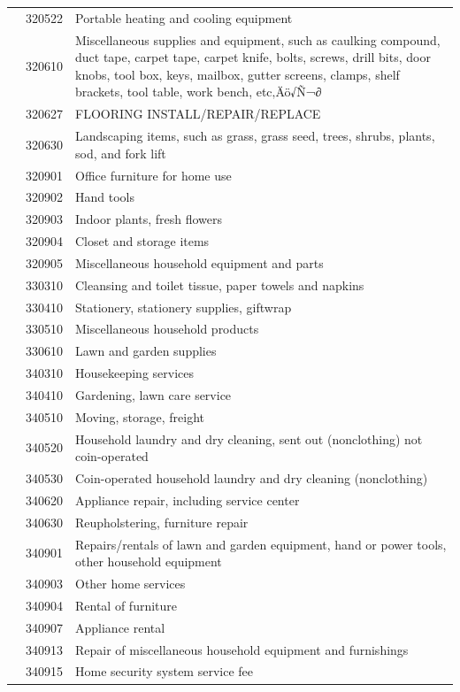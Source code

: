 \documentclass[
]{agujournal2019}
\begin{document}
\begin{table}
{\begin{tabular*}{\linewidth}{@{\extracolsep{\fill}}l|rl}
 & 320522 & Portable heating and cooling equipment \\ 
 & 320610 & Miscellaneous supplies and equipment, such as caulking compound, duct tape, carpet tape, carpet knife, bolts, screws, drill bits, door knobs, tool box, keys, mailbox, gutter screens, clamps, shelf brackets, tool table, work bench, etc‚Äö√Ñ¬∂ \\ 
 & 320627 & FLOORING INSTALL/REPAIR/REPLACE \\ 
 & 320630 & Landscaping items, such as grass, grass seed, trees, shrubs, plants, sod, and fork lift \\ 
 & 320901 & Office furniture for home use \\ 
 & 320902 & Hand tools \\ 
 & 320903 & Indoor plants, fresh flowers \\ 
 & 320904 & Closet and storage items \\ 
 & 320905 & Miscellaneous household equipment and parts \\ 
 & 330310 & Cleansing and toilet tissue, paper towels and napkins \\ 
 & 330410 & Stationery, stationery supplies, giftwrap \\ 
 & 330510 & Miscellaneous household products \\ 
 & 330610 & Lawn and garden supplies \\ 
 & 340310 & Housekeeping services \\ 
 & 340410 & Gardening, lawn care service \\ 
 & 340510 & Moving, storage, freight \\ 
 & 340520 & Household laundry and dry cleaning, sent out (nonclothing) not coin-operated \\ 
 & 340530 & Coin-operated household laundry and dry cleaning (nonclothing) \\ 
 & 340620 & Appliance repair, including service center \\ 
 & 340630 & Reupholstering, furniture repair \\ 
 & 340901 & Repairs/rentals of lawn and garden equipment, hand or power tools, other household equipment \\ 
 & 340903 & Other home services \\ 
 & 340904 & Rental of furniture \\ 
 & 340907 & Appliance rental \\ 
 & 340913 & Repair of miscellaneous household equipment and furnishings \\ 
 & 340915 & Home security system service fee \\ 

\end{tabular*}}
\end{table}
\end{document}
